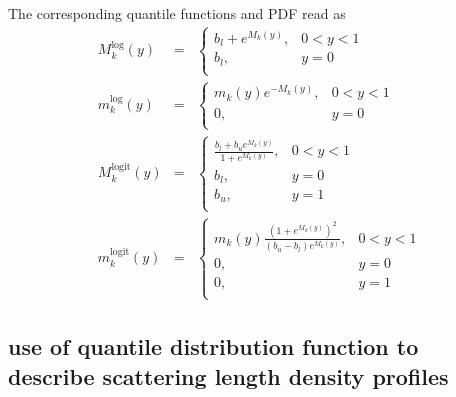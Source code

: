 The corresponding quantile functions and PDF read as
\begin{eqnarray}
   M_k^{\log}(y) &=&  \left\{{\begin{array}{ll}
    b_l+e^{M_k(y)}, & 0<y<1 \\
    b_l, & y=0\\
    \end{array}}\right. \label{eq:MkLog}\\
   m_k^{\log}(y) &=&  \left\{{\begin{array}{ll}
    m_k(y)e^{-M_k(y)}, & 0<y<1 \\
    0, & y=0\\
    \end{array}}\right. \label{eq:mkLog}\\
   M_k^{\mathrm{logit}}(y) &=&  \left\{{\begin{array}{ll}
    \frac{b_l+b_ue^{M_k(y)}}{1+e^{M_k(y)}}, & 0<y<1 \\
    b_l, & y=0\\
    b_u, & y=1\\
    \end{array}}\right. \label{eq:MkLogit}\\
   m_k^{\mathrm{logit}}(y) &=&  \left\{{\begin{array}{ll}
    m_k(y)\frac{\left(1+e^{M_k(y)}\right)^2}{(b_u-b_l)e^{M_k(y)}}, & 0<y<1 \\
    0, & y=0\\
    0, & y=1\\
    \end{array}}\right. \label{eq:mkLogit}
 \end{eqnarray}

\subsection{use of quantile distribution function to describe scattering length density profiles} 